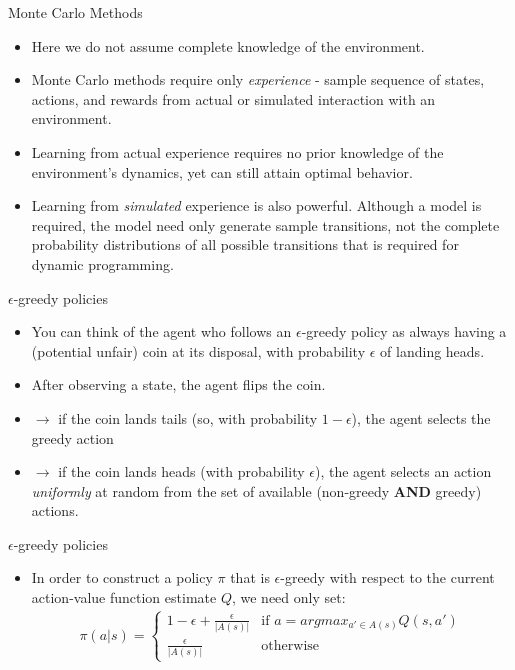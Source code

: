 \documentclass[10pt,mathserif]{beamer}
\begin{document}
\begin{frame}{Monte Carlo Methods}
\begin{itemize}
\item Here we do not assume complete knowledge of the environment.
\item Monte Carlo methods require only \textit{experience} - sample sequence of states, actions, and
rewards from actual or simulated interaction with an environment.
\item Learning from actual experience requires no prior knowledge of the environment's dynamics, yet can still attain optimal behavior.
\item Learning from \textit{simulated} experience is also powerful. Although a model is required, the model need only generate sample transitions, not the complete probability distributions of all possible transitions that is required for dynamic programming.
\end{itemize}
\end{frame}

\begin{frame}{$\epsilon$-greedy policies}
\begin{itemize}
\item You can think of the agent who follows an $\epsilon$-greedy policy as always having a (potential unfair) coin at its disposal, with probability
$\epsilon$ of landing heads. 
\item After observing a state, the agent flips the coin.
\item $\rightarrow$ if the coin lands tails (so, with probability $1-\epsilon$), the agent selects the greedy action
\item $\rightarrow$ if the coin lands heads (with probability $\epsilon$), the agent selects an action \textit{uniformly} at random from the set of available (non-greedy \textbf{AND} greedy) actions.
\end{itemize}
\end{frame}

\begin{frame}{$\epsilon$-greedy policies}
\begin{itemize}
\item In order to construct a policy $\pi$ that is $\epsilon$-greedy with respect to the current action-value function estimate $Q$, we
need only set:
\begin{align}
\pi(a|s) = 
\left\{
        \begin{array}{ll}
                1 - \epsilon + \frac{\epsilon}{|A(s)|}  & \mbox{if } a = argmax_{a'\in A(s)} Q(s, a') \\
                \frac{\epsilon}{|A(s)|} & \mbox{otherwise}
        \end{array}
\right.
\end{align}
\end{itemize}
\end{frame}
\end{document}
